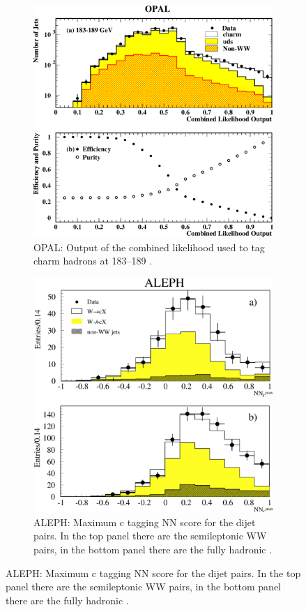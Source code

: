 \begin{figure}[H]
    \begin{subfigure}{0.48\linewidth}
        \centering
         \includegraphics[width=\linewidth]{fig//chap02-theory/opal.png}
         \caption{OPAL: Output of the combined likelihood used to tag charm hadrons at 183–189 \GeV\cite{Abbiendi2000ADecays}.\\}
    \end{subfigure}
     \hfill
     \begin{subfigure}{0.475\linewidth}
         \centering
        \includegraphics[width=\linewidth]{fig//chap02-theory/aleph.png}
         \caption{ALEPH: Maximum c tagging NN score for the dijet pairs. In the top panel there are the semileptonic WW pairs, in the bottom panel there are the fully hadronic \cite{Barate1999ATag}.}
     \end{subfigure}
        \label{fig:rc_lep}
\end{figure}
